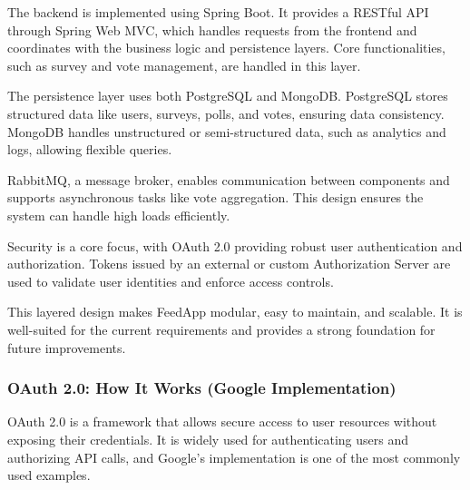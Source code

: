 The backend is implemented using Spring Boot. It provides a RESTful API through Spring Web MVC, which handles requests from the frontend and coordinates with the business logic and persistence layers. Core functionalities, such as survey and vote management, are handled in this layer.

The persistence layer uses both PostgreSQL and MongoDB. PostgreSQL stores structured data like users, surveys, polls, and votes, ensuring data consistency. MongoDB handles unstructured or semi-structured data, such as analytics and logs, allowing flexible queries.

RabbitMQ, a message broker, enables communication between components and supports asynchronous tasks like vote aggregation. This design ensures the system can handle high loads efficiently.

Security is a core focus, with OAuth 2.0 providing robust user authentication and authorization. Tokens issued by an external or custom Authorization Server are used to validate user identities and enforce access controls.

This layered design makes FeedApp modular, easy to maintain, and scalable. It is well-suited for the current requirements and provides a strong foundation for future improvements.



\subsubsection{OAuth 2.0: How It Works (Google Implementation)}
OAuth 2.0 is a framework that allows secure access to user resources without exposing their credentials. It is widely used for authenticating users and authorizing API calls, and Google’s implementation is one of the most commonly used examples.

